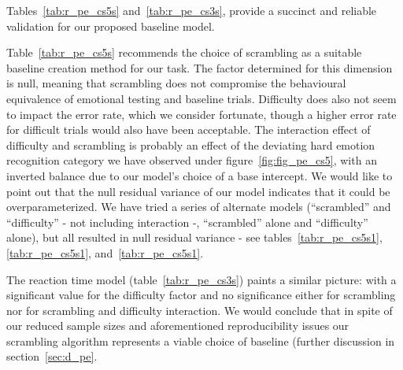 	    
	    Tables~\ref{tab:r_pe_cs5s} and~\ref{tab:r_pe_cs3s}, provide a succinct and reliable validation for our proposed baseline model.
	    
	    Table~\ref{tab:r_pe_cs5s} recommends the choice of scrambling as a suitable baseline creation method for our task.
	    The factor determined for this dimension is null, meaning that scrambling does not compromise the behavioural equivalence of emotional testing and baseline trials.
	    Difficulty does also not seem to impact the error rate, which we consider fortunate, though a higher error rate for difficult trials would also have been acceptable.
	    The interaction effect of difficulty and scrambling is probably an effect of the deviating hard emotion recognition category we have observed under figure~\ref{fig:fig_pe_cs5}, with an inverted balance due to our model's choice of a base intercept.
	    We would like to point out that the null residual variance of our model indicates that it could be overparameterized.
	    We have tried a series of alternate models (“scrambled” and “difficulty” - not including interaction -, “scrambled” alone and “difficulty” alone), but all resulted in null residual variance - 
	    see tables~\ref{tab:r_pe_cs5s1}, \ref{tab:r_pe_cs5s1}, and~\ref{tab:r_pe_cs5s1}.
	    
	    The reaction time model (table~\ref{tab:r_pe_cs3s}) paints a similar picture: with a significant value for the difficulty factor and no significance either for scrambling nor for scrambling and difficulty interaction.
	    We would conclude that in spite of our reduced sample sizes and aforementioned reproducibility issues our scrambling algorithm represents a viable choice of baseline (further discussion in section~\ref{sec:d_pe}.
	    
